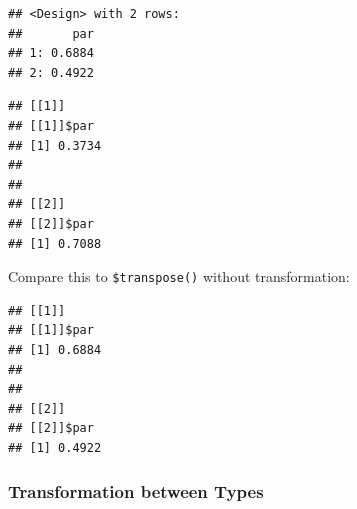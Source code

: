 \documentclass[
]{scrbook}
\newenvironment{Shaded}{\begin{snugshade}}{\end{snugshade}}
\newcommand{\AttributeTok}[1]{\textcolor[rgb]{0.77,0.63,0.00}{#1}}
\newcommand{\CommentTok}[1]{\textcolor[rgb]{0.56,0.35,0.01}{\textit{#1}}}
\newcommand{\ConstantTok}[1]{\textcolor[rgb]{0.00,0.00,0.00}{#1}}
\newcommand{\ControlFlowTok}[1]{\textcolor[rgb]{0.13,0.29,0.53}{\textbf{#1}}}
\newcommand{\DecValTok}[1]{\textcolor[rgb]{0.00,0.00,0.81}{#1}}
\newcommand{\FunctionTok}[1]{\textcolor[rgb]{0.00,0.00,0.00}{#1}}
\newcommand{\NormalTok}[1]{#1}
\newcommand{\OtherTok}[1]{\textcolor[rgb]{0.56,0.35,0.01}{#1}}
\newcommand{\SpecialCharTok}[1]{\textcolor[rgb]{0.00,0.00,0.00}{#1}}
\newcommand{\StringTok}[1]{\textcolor[rgb]{0.31,0.60,0.02}{#1}}
\renewenvironment{Shaded} {\begin{snugshade}\small} {\end{snugshade}}
\begin{document}
\begin{Shaded}
\end{Shaded}

\begin{verbatim}
## <Design> with 2 rows:
##       par
## 1: 0.6884
## 2: 0.4922
\end{verbatim}

\begin{Shaded}
\end{Shaded}

\begin{verbatim}
## [[1]]
## [[1]]$par
## [1] 0.3734
## 
## 
## [[2]]
## [[2]]$par
## [1] 0.7088
\end{verbatim}

Compare this to \texttt{\$transpose()} without transformation:

\begin{Shaded}
\end{Shaded}

\begin{verbatim}
## [[1]]
## [[1]]$par
## [1] 0.6884
## 
## 
## [[2]]
## [[2]]$par
## [1] 0.4922
\end{verbatim}

\hypertarget{transformation-between-types}{%
\subsubsection{Transformation between Types}\label{transformation-between-types}}
\end{document}
